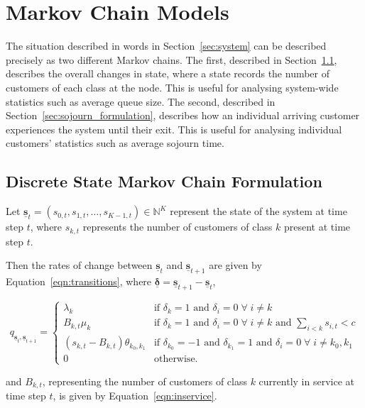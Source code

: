 \documentclass{article}
\begin{document}
\section{Markov Chain Models}\label{sec:makovchains}
The situation described in words in Section~\ref{sec:system} can be described
precisely as two different Markov chains.
The first, described in Section~\ref{sec:state_formulation}, describes the
overall changes in state, where a state records the number of customers of each
class at the node. This is useful for analysing system-wide statistics such as
average queue size.
The second, described in Section~\ref{sec:sojourn_formulation}, describes how an
individual arriving customer experiences the system until their exit. This is
useful for analysing individual customers' statistics such as average sojourn
time.


\subsection{Discrete State Markov Chain Formulation}\label{sec:state_formulation}
Let
$\underline{\mathbf{s}}_t = (s_{0,t}, s_{1,t}, \dots, s_{K-1,t}) \in \mathbb{N}^K$
represent the state of the system at time step $t$, where $s_{k,t}$ represents
the number of customers of class $k$ present at time step $t$.

Then the rates of change between $\underline{\mathbf{s}}_t$ and
$\underline{\mathbf{s}}_{t+1}$ are given by Equation~\ref{eqn:transitions},
where $\underline{\mathbf{\delta}} = \underline{\mathbf{s}}_{t+1} - \underline{\mathbf{s}}_t$,

\begin{equation}\label{eqn:transitions}
q_{\underline{\mathbf{s}}_t, \underline{\mathbf{s}}_{t+1}} = 
\begin{cases}
\lambda_k & \text{if } \delta_k = 1 \text{ and } \delta_i = 0 \; \forall \; i \neq k \\
B_{k,t} \mu_k & \text{if } \delta_k = 1 \text{ and } \delta_i = 0 \; \forall \; i \neq k \text{ and } \sum_{i < k} s_{i,t} < c \\
(s_{k,t} - B_{k,t}) \theta_{k_0,k_1} & \text{if } \delta_{k_0} = -1 \text{ and } \delta_{k_1} = 1 \text{ and } \delta_i = 0 \; \forall \; i \neq k_0, k_1 \\
0 & \text{otherwise.}
\end{cases}
\end{equation}

and $B_{k,t}$, representing the number of customers of class $k$ currently in
service at time step $t$, is given by Equation~\ref{eqn:inservice}.
\end{document}

